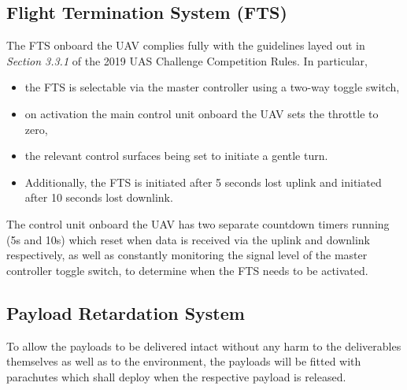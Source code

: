 \subsection{Flight Termination System (FTS)} \label{sec:fts}
The FTS onboard the UAV complies fully with the guidelines layed out in \textit{Section 3.3.1} of the 2019 UAS Challenge Competition Rules. In particular,
\begin{itemize}
\item the FTS is selectable via the master controller using a two-way toggle switch,
\item on activation the main control unit onboard the UAV sets the throttle to zero,
\item the relevant control surfaces being set to initiate a gentle turn.
\item Additionally, the FTS is initiated after 5 seconds lost uplink and initiated after 10 seconds lost downlink.
\end{itemize}
The control unit onboard the UAV has two separate countdown timers running (5s and 10s) which reset when data is received via the uplink and downlink respectively, as well as constantly monitoring the signal level of the master controller toggle switch, to determine when the FTS needs to be activated.

\subsection{Payload Retardation System}
To allow the payloads to be delivered intact without any harm to the deliverables themselves as well as to the environment, the payloads will be fitted with parachutes which shall deploy when the respective payload is released.
